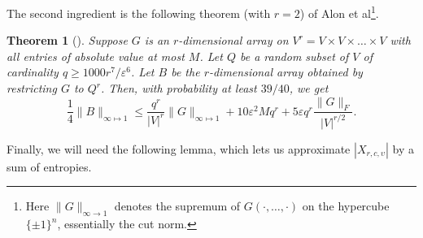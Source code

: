 \documentclass[final, 12pt]{colt2018}
\newtheorem{theorem}{Theorem}[section]
\theoremstyle{definition}
\theoremstyle{plain}
\begin{document}
The second ingredient is the following theorem (with $r = 2$) of Alon et al\footnote{Here $\|G\|_{\infty \to 1}$ denotes the supremum of $G(\cdot,\ldots,\cdot)$ on the hypercube $\{\pm 1\}^n$, essentially the cut norm.}. 

\begin{theorem}[\citet{alon-etal-samplingCSP-conference}]
\label{thm-alon-et-al-sampling-cutnorm}
Suppose $G$
is an $r$-dimensional array on $V^{r}=V\times V\times\dots\times V$
with all entries of absolute value at most $M$. Let $Q$ be a random
subset of $V$ of cardinality $q\geq1000r^{7}/\varepsilon^{6}$. Let
$B$ be the $r$-dimensional array obtained by restricting $G$ to
$Q^{r}$. Then, with probability at least $39/40$, we get 
\[
\frac{1}{4}\|B\|_{\infty \mapsto 1}\leq\frac{q^{r}}{|V|^{r}} \|G\|_{\infty \mapsto 1} + 10\varepsilon^{2}Mq^{r}+5\varepsilon q^{r}\frac{\|G\|_{F}}{|V|^{r/2}}.
\]
\end{theorem}


\iffalse %
Finally, we will need the following lemma, which lets us approximate $|X_{r,c,\upsilon}|$ by a sum of entropies.    
\end{document}

